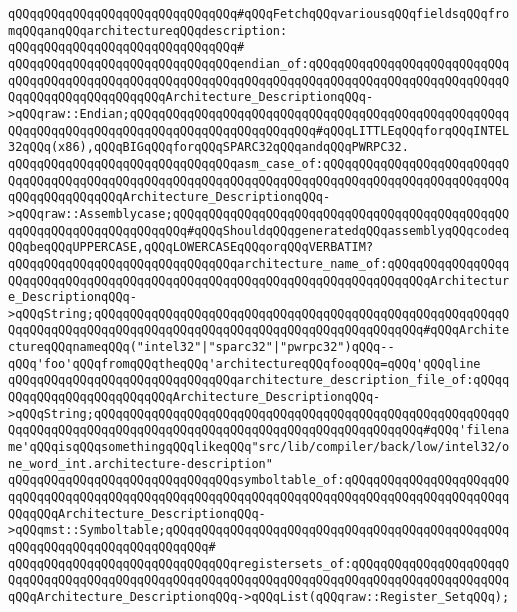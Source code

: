 \verb|qQQqqQQqqQQqqQQqqQQqqQQqqQQqqQQq#qQQqFetchqQQqvariousqQQqfieldsqQQqfromqQQqanqQQqarchitectureqQQqdescription:|\newline
\verb|qQQqqQQqqQQqqQQqqQQqqQQqqQQqqQQq#|\newline
\verb|qQQqqQQqqQQqqQQqqQQqqQQqqQQqqQQqendian_of:qQQqqQQqqQQqqQQqqQQqqQQqqQQqqQQqqQQqqQQqqQQqqQQqqQQqqQQqqQQqqQQqqQQqqQQqqQQqqQQqqQQqqQQqqQQqqQQqqQQqqQQqqQQqqQQqqQQqqQQqArchitecture_DescriptionqQQq->qQQqraw::Endian;qQQqqQQqqQQqqQQqqQQqqQQqqQQqqQQqqQQqqQQqqQQqqQQqqQQqqQQqqQQqqQQqqQQqqQQqqQQqqQQqqQQqqQQqqQQqqQQq#qQQqLITTLEqQQqforqQQqINTEL32qQQq(x86),qQQqBIGqQQqforqQQqSPARC32qQQqandqQQqPWRPC32.|\newline
\verb|qQQqqQQqqQQqqQQqqQQqqQQqqQQqqQQqasm_case_of:qQQqqQQqqQQqqQQqqQQqqQQqqQQqqQQqqQQqqQQqqQQqqQQqqQQqqQQqqQQqqQQqqQQqqQQqqQQqqQQqqQQqqQQqqQQqqQQqqQQqqQQqqQQqqQQqArchitecture_DescriptionqQQq->qQQqraw::Assemblycase;qQQqqQQqqQQqqQQqqQQqqQQqqQQqqQQqqQQqqQQqqQQqqQQqqQQqqQQqqQQqqQQqqQQqqQQq#qQQqShouldqQQqgeneratedqQQqassemblyqQQqcodeqQQqbeqQQqUPPERCASE,qQQqLOWERCASEqQQqorqQQqVERBATIM?|\newline
\verb|qQQqqQQqqQQqqQQqqQQqqQQqqQQqqQQqarchitecture_name_of:qQQqqQQqqQQqqQQqqQQqqQQqqQQqqQQqqQQqqQQqqQQqqQQqqQQqqQQqqQQqqQQqqQQqqQQqqQQqArchitecture_DescriptionqQQq->qQQqString;qQQqqQQqqQQqqQQqqQQqqQQqqQQqqQQqqQQqqQQqqQQqqQQqqQQqqQQqqQQqqQQqqQQqqQQqqQQqqQQqqQQqqQQqqQQqqQQqqQQqqQQqqQQqqQQqqQQq#qQQqArchitectureqQQqnameqQQq("intel32"|\verb#|"sparc32"|"pwrpc32")qQQq--qQQq'foo'qQQqfromqQQqtheqQQq'architectureqQQqfooqQQq=qQQq'qQQqline#\newline
\verb|qQQqqQQqqQQqqQQqqQQqqQQqqQQqqQQqarchitecture_description_file_of:qQQqqQQqqQQqqQQqqQQqqQQqqQQqArchitecture_DescriptionqQQq->qQQqString;qQQqqQQqqQQqqQQqqQQqqQQqqQQqqQQqqQQqqQQqqQQqqQQqqQQqqQQqqQQqqQQqqQQqqQQqqQQqqQQqqQQqqQQqqQQqqQQqqQQqqQQqqQQqqQQqqQQq#qQQq'filename'qQQqisqQQqsomethingqQQqlikeqQQq"src/lib/compiler/back/low/intel32/one_word_int.architecture-description"|\newline
\verb|qQQqqQQqqQQqqQQqqQQqqQQqqQQqqQQqsymboltable_of:qQQqqQQqqQQqqQQqqQQqqQQqqQQqqQQqqQQqqQQqqQQqqQQqqQQqqQQqqQQqqQQqqQQqqQQqqQQqqQQqqQQqqQQqqQQqqQQqqQQqArchitecture_DescriptionqQQq->qQQqmst::Symboltable;qQQqqQQqqQQqqQQqqQQqqQQqqQQqqQQqqQQqqQQqqQQqqQQqqQQqqQQqqQQqqQQqqQQqqQQqqQQq#|\newline
\verb|qQQqqQQqqQQqqQQqqQQqqQQqqQQqqQQqregistersets_of:qQQqqQQqqQQqqQQqqQQqqQQqqQQqqQQqqQQqqQQqqQQqqQQqqQQqqQQqqQQqqQQqqQQqqQQqqQQqqQQqqQQqqQQqqQQqqQQqArchitecture_DescriptionqQQq->qQQqList(qQQqraw::Register_SetqQQq);|\newline

